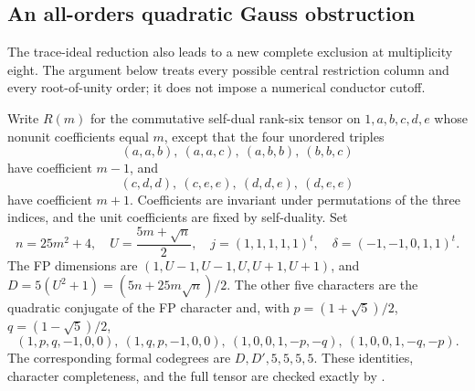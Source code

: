\subsection{An all-orders quadratic Gauss obstruction}
\label{subsec:quadratic-gauss-family}
The trace-ideal reduction also leads to a new complete exclusion at
multiplicity eight.  The argument below treats every possible central
restriction column and every root-of-unity order; it does not impose a
numerical conductor cutoff.

Write $R(m)$ for the commutative self-dual rank-six tensor on
$1,a,b,c,d,e$ whose nonunit coefficients equal $m$, except that the four
unordered triples
\[
 (a,a,b),\ (a,a,c),\ (a,b,b),\ (b,b,c)
\]
have coefficient $m-1$, and
\[
 (c,d,d),\ (c,e,e),\ (d,d,e),\ (d,e,e)
\]
have coefficient $m+1$.  Coefficients are invariant under permutations of
the three indices, and the unit coefficients are fixed by self-duality.
Set
\[
 n=25m^2+4,\quad U=\frac{5m+\sqrt n}{2},\quad
 j=(1,1,1,1,1)^t,\quad\delta=(-1,-1,0,1,1)^t.
\]
The FP dimensions are $(1,U-1,U-1,U,U+1,U+1)$, and
$D=5(U^2+1)=(5n+25m\sqrt n)/2$.
The other five characters are the quadratic conjugate of the FP
character and, with $p=(1+\sqrt5)/2$, $q=(1-\sqrt5)/2$,
\[
 (1,p,q,-1,0,0),\ (1,q,p,-1,0,0),\
 (1,0,0,1,-p,-q),\ (1,0,0,1,-q,-p).
\]
The corresponding formal codegrees are $D,D',5,5,5,5$.
These identities, character completeness, and the full tensor are checked
exactly by \filename{gauss\_family.py}.

